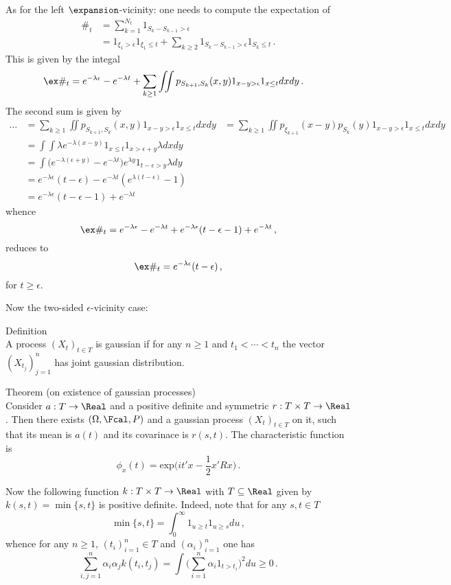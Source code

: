As for the left $\expansion$-vicinity: one needs to compute the expectation of
\begin{align*}
	\#_t &= \sum_{k=1}^{N_t} 1_{ S_k - S_{k-1} > \epsilon }\\
		 &= 1_{ \xi_1 > \epsilon }1_{\xi_1 \leq t}
		 	+ \sum_{k\geq 2} 1_{ S_k - S_{k-1} > \epsilon }1_{S_k\leq t} \,.
\end{align*}
This is given by the integal
\begin{align*}
	\ex \#_t
		&= e^{-\lambda \epsilon} - e^{-\lambda t} +
			\sum_{k\geq1} \iint p_{S_{k+1},S_k}(x,y) 1_{x-y>\epsilon}1_{x\leq t}dxdy \,.
\end{align*}
The second sum is given by
\begin{align*}
	\ldots
		&= \sum_{k\geq1} \iint p_{S_{k+1},S_k}(x,y) 1_{x-y>\epsilon}1_{x\leq t}dxdy
		&= \sum_{k\geq1} \iint p_{\xi_{k+1}}(x-y) p_{S_k}(y) 1_{x-y>\epsilon}1_{x\leq t} dxdy \\
		&= \int \int \lambda e^{-\lambda(x-y)} 1_{x\leq t} 1_{x>\epsilon+y} \lambda dxdy \\
		&= \int \bigl(e^{-\lambda (\epsilon+y)} - e^{-\lambda t}\bigr)
					e^{\lambda y} 1_{t-\epsilon > y} \lambda dy \\
		&= e^{-\lambda \epsilon} (t-\epsilon) - e^{-\lambda t} (e^{\lambda (t-\epsilon)} - 1)\\
		&= e^{-\lambda \epsilon} (t-\epsilon-1) + e^{-\lambda t}
\end{align*}
whence
\[ \ex \#_t
	= e^{-\lambda \epsilon} - e^{-\lambda t} +
		e^{-\lambda \epsilon} (t-\epsilon-1) + e^{-\lambda t} \,, \]
reduces to
\[ \ex \#_t = e^{-\lambda \epsilon} (t-\epsilon) \,,\]
for $t\geq \epsilon$.

Now the two-sided $\epsilon$-vicinity case:

\noindent Definition\hfill\\
A process $(X_t)_{t\in T}$ is gaussian if for any $n\geq1$ and $t_1<\cdots<t_n$
the vector $(X_{t_j})_{j=1}^n$ has joint gaussian distribution.

\noindent Theorem (on existence of gaussian processes)\hfill\\
Consider $a:T\to \Real$ and a positive definite and symmetric $r:T\times T\to \Real$.
Then there exists $(\Omega, \Fcal, P)$ and a gaussian process $(X_t)_{t\in T}$ on it,
such that its mean is $a(t)$ and its covarinace is $r(s,t)$. The characteristic
function is
\[\phi_x( t ) =  \text{exp}\bigl( i t'x - \frac{1}{2} x'Rx \bigr) \,. \]

Now the following function $k:T\times T\to\Real$ with $T\subseteq \Real$ given by
$k(s,t) = \min\{s,t\}$ is positive definite. Indeed, note that for any $s,t\in T$
\[ \min\{s,t\} = \int_0^\infty 1_{u\geq t} 1_{u\geq s} du \,, \]
whence for any $n\geq 1$, $(t_i)_{i=1}^n\in T$ and $(\alpha_i)_{i=1}^n$ one has
\[
	\sum_{i,j=1}^n \alpha_i\alpha_j k(t_i, t_j)
		= \int \bigl( \sum_{i=1}^n \alpha_i 1_{t>t_i} \Bigr)^2 du
		\geq 0
\,. \]

